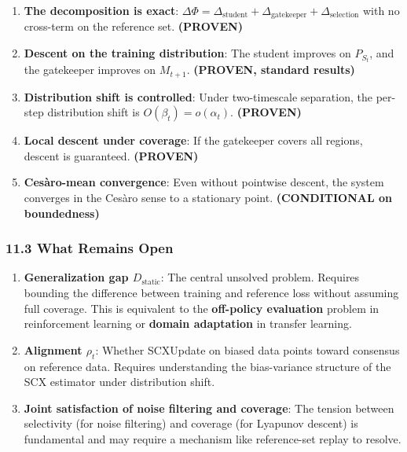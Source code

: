 \documentclass[
  12pt,
]{ctexart}
\begin{document}
\begin{enumerate}
\def\labelenumi{\arabic{enumi}.}
\item
  \textbf{The decomposition is exact}:
  \(\Delta\Phi = \Delta_{\text{student}} + \Delta_{\text{gatekeeper}} + \Delta_{\text{selection}}\)
  with no cross-term on the reference set. \textbf{(PROVEN)}
\item
  \textbf{Descent on the training distribution}: The student improves on
  \(P_{S_t}\), and the gatekeeper improves on \(M_{t+1}\).
  \textbf{(PROVEN, standard results)}
\item
  \textbf{Distribution shift is controlled}: Under two-timescale
  separation, the per-step distribution shift is
  \(O(\beta_t) = o(\alpha_t)\). \textbf{(PROVEN)}
\item
  \textbf{Local descent under coverage}: If the gatekeeper covers all
  regions, descent is guaranteed. \textbf{(PROVEN)}
\item
  \textbf{Cesàro-mean convergence}: Even without pointwise descent, the
  system converges in the Cesàro sense to a stationary point.
  \textbf{(CONDITIONAL on boundedness)}
\end{enumerate}

\subsubsection{11.3 What Remains Open}\label{what-remains-open}

\begin{enumerate}
\def\labelenumi{\arabic{enumi}.}
\item
  \textbf{Generalization gap \(D_{\text{static}}\)}: The central
  unsolved problem. Requires bounding the difference between training
  and reference loss without assuming full coverage. This is equivalent
  to the \textbf{off-policy evaluation} problem in reinforcement
  learning or \textbf{domain adaptation} in transfer learning.
\item
  \textbf{Alignment \(\rho_t\)}: Whether SCXUpdate on biased data points
  toward consensus on reference data. Requires understanding the
  bias-variance structure of the SCX estimator under distribution shift.
\item
  \textbf{Joint satisfaction of noise filtering and coverage}: The
  tension between selectivity (for noise filtering) and coverage (for
  Lyapunov descent) is fundamental and may require a mechanism like
  reference-set replay to resolve.
\end{enumerate}
\end{document}
